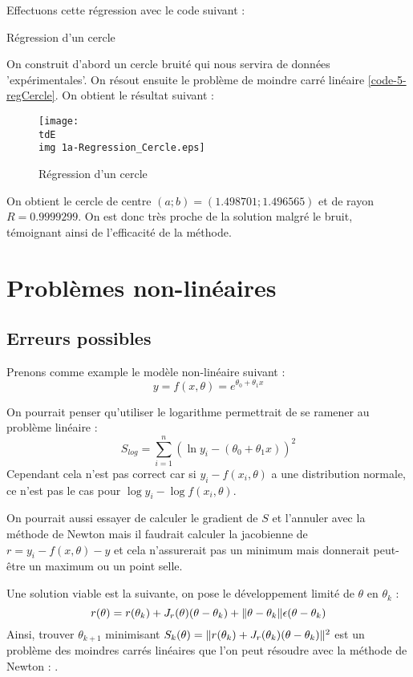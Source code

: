 		Effectuons cette régression avec le code suivant :

		\begin{listing}[H]
			\caption{Régression d'un cercle}
			\label{code-5-regCercle}
		\end{listing}

		On construit d'abord un cercle bruité qui nous servira de données 'expérimentales'. On résout ensuite le problème de moindre carré linéaire \eqref{code-5-regCercle}. On obtient le résultat suivant :

		\begin{figure}[H]
			\centering
			\texttt{[image: \\tdE\\img 1a-Regression\_Cercle.eps]}
			\caption{Régression d'un cercle}
			\label{img-5-regCercle}
		\end{figure}

		On obtient le cercle de centre $(a; b) = (1.498701; 1.496565)$ et de rayon $R=0.9999299$. On est donc très proche de la solution malgré le bruit, témoignant ainsi de l'efficacité de la méthode.


\section{Problèmes non-linéaires}

	\subsection{Erreurs possibles}
		Prenons comme example le modèle non-linéaire suivant :
		$$
			y = f(x,\theta) = e^{\theta_0 + \theta_1 x}
		$$

		On pourrait penser qu'utiliser le logarithme permettrait de se ramener au problème linéaire :
		\begin{equation}
			\label{eq-5-logTrickS}
			S_{log} = \sum_{i=1}^n \left( \ln y_i - (\theta_0 + \theta_1 x) \right)^2
		\end{equation}
		Cependant cela n'est pas correct car si $y_i - f(x_i, \theta)$ a une distribution normale, ce n'est pas le cas pour $\log y_i - \log f(x_i, \theta)$.

		On pourrait aussi essayer de calculer le gradient de $S$ et l'annuler avec la méthode de Newton mais il faudrait calculer la jacobienne de $r = y_i - f(x, \theta) - y$ et cela n'assurerait pas un minimum mais donnerait peut-être un maximum ou un point selle.

		Une solution viable est la suivante, on pose le développement limité de $\theta$ en $\theta_k$ :
		$$
			r(\theta) = r(\theta_k) + J_r(\theta)(\theta - \theta_k) + \lVert \theta - \theta_k \rVert\epsilon(\theta - \theta_k)
		$$
		Ainsi, trouver $\theta_{k+1}$ minimisant $S_k(\theta) = \lVert r(\theta_k) +J_r(\theta_k)(\theta -\theta_k)  \rVert^2$ 
		est un problème des moindres carrés linéaires que l'on peut résoudre avec la méthode de Newton : .


